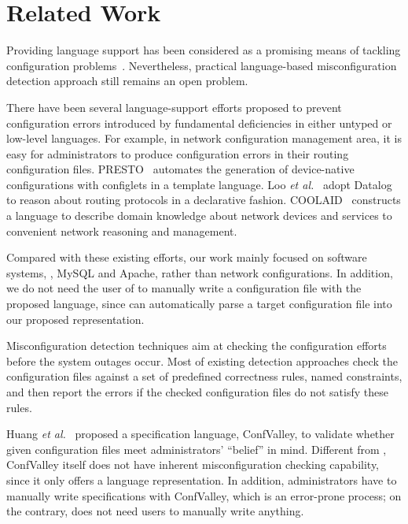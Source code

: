 
\section{Related Work}

Providing language support has been considered as a promising means
of tackling configuration problems~\cite{xu15systems}.
Nevertheless, practical language-based misconfiguration
detection approach still remains an open problem.

There have been several language-support efforts proposed to prevent
configuration errors introduced by fundamental deficiencies in
either untyped or low-level languages. For example, in network
configuration management area, it is easy for administrators to
produce configuration errors in their routing configuration files.
PRESTO~\cite{} automates the generation of device-native configurations
with configlets in a template language. 
Loo {\em et al.}~\cite{} adopt Datalog to reason about 
routing protocols in a declarative fashion. COOLAID~\cite{} constructs
a language to describe domain knowledge about network devices and
services to convenient network reasoning and management.

Compared with these existing efforts, 
our work mainly focused on software systems, \eg, MySQL and Apache,
rather than network configurations. In addition, we do not need 
the user of \app to manually write a configuration file with the proposed
language, since \app can automatically parse a target configuration
file into our proposed representation.

Misconfiguration detection techniques aim at checking the configuration
efforts before the system outages occur.
Most of existing detection approaches check 
the configuration files against a set of predefined correctness 
rules, named constraints, and then report the errors if 
the checked configuration files do not satisfy these rules.

Huang {\em et al.}~\cite{huang15confvalley} proposed a specification 
language, ConfValley, to validate 
whether given configuration files meet administrators' 
``belief'' in mind. Different from \app, ConfValley itself does not
have inherent misconfiguration checking capability, since it only offers
a language representation. In addition, administrators have to
manually write specifications with ConfValley, which is an error-prone
process; on the contrary, \app does not need users to manually
write anything.


